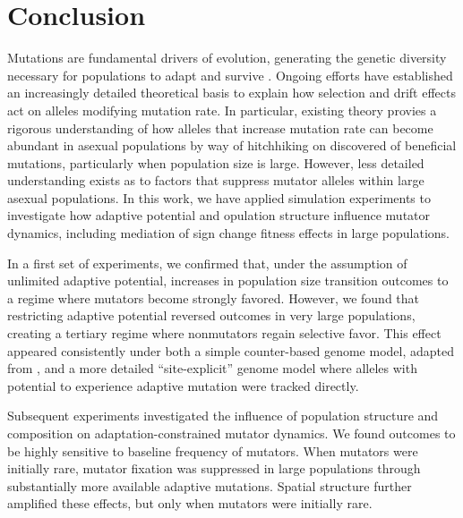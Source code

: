 \section{Conclusion} \label{sec:conclusion}


Mutations are fundamental drivers of evolution, generating the genetic diversity necessary for populations to adapt and survive \citep{hershberg2015mutation}.
Ongoing efforts have established an increasingly detailed theoretical basis to explain how selection and drift effects act on alleles modifying mutation rate.
In particular, existing theory provies a rigorous understanding of how alleles that increase mutation rate can become abundant in asexual populations by way of hitchhiking on discovered of beneficial mutations, particularly when population size is large.
However, less detailed understanding exists as to factors that suppress mutator alleles within large asexual populations.
In this work, we have applied simulation experiments to investigate how adaptive potential and opulation structure influence mutator dynamics, including mediation of sign change fitness effects in large populations.

In a first set of experiments, we confirmed that, under the assumption of unlimited adaptive potential, increases in population size transition outcomes to a regime where mutators become strongly favored.
However, we found that restricting adaptive potential reversed outcomes in very large populations, creating a tertiary regime where nonmutators regain selective favor.
This effect appeared consistently under both a simple counter-based genome model, adapted from \citet{raynes2018sign}, and a more detailed ``site-explicit'' genome model where alleles with potential to experience adaptive mutation were tracked directly.

Subsequent experiments investigated the influence of population structure and composition on adaptation-constrained mutator dynamics.
We found outcomes to be highly sensitive to baseline frequency of mutators.
When mutators were initially rare, mutator fixation was suppressed in large populations through substantially more available adaptive mutations.
Spatial structure further amplified these effects, but only when mutators were initially rare.

